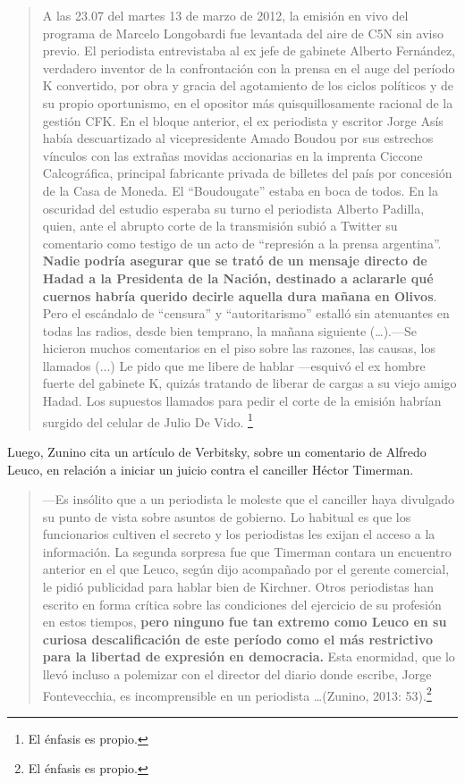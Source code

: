 \begin{quote}
A las 23.07 del martes 13 de marzo de 2012, la emisión en vivo del programa de Marcelo Longobardi fue levantada del aire de C5N sin aviso previo. El periodista entrevistaba al ex jefe de gabinete Alberto Fernández, verdadero inventor de la confrontación con la prensa en el auge del período K convertido, por obra y gracia del agotamiento de los ciclos políticos y de su propio oportunismo, en el opositor más quisquillosamente racional de la gestión CFK. En el bloque anterior, el ex periodista y escritor Jorge Asís había descuartizado al vicepresidente Amado Boudou por sus estrechos vínculos con las extrañas movidas accionarias en la imprenta Ciccone Calcográfica, principal fabricante privada de billetes del país por concesión de la Casa de Moneda. El ``Boudougate'' estaba en boca de todos. En la oscuridad del estudio esperaba su turno el periodista Alberto Padilla, quien, ante el abrupto corte de la transmisión subió a Twitter su comentario como testigo de un acto de ``represión a la prensa argentina''. \textbf{Nadie podría asegurar que se trató de un mensaje directo de Hadad a la Presidenta de la Nación, destinado a aclararle qué cuernos habría querido decirle aquella dura mañana en Olivos}. Pero el escándalo de ``censura'' y ``autoritarismo'' estalló sin atenuantes en todas las radios, desde bien temprano, la mañana siguiente (\ldots).---Se hicieron muchos comentarios en el piso sobre las razones, las causas, los llamados (...) Le pido que me libere de hablar ---esquivó el ex hombre fuerte del gabinete K, quizás tratando de liberar de cargas a su viejo amigo Hadad. Los supuestos llamados para pedir el corte de la emisión habrían surgido del celular de Julio De Vido. \footnote{El énfasis es propio.}
\end{quote}

Luego, Zunino cita un artículo de Verbitsky, sobre un comentario de Alfredo Leuco, en relación a iniciar un juicio contra el canciller Héctor Timerman.

\begin{quote}
---Es insólito que a un periodista le moleste que el canciller haya divulgado su punto de vista sobre asuntos de gobierno. Lo habitual es que los funcionarios cultiven el secreto y los periodistas les exijan el acceso a la información. La segunda sorpresa fue que Timerman contara un encuentro anterior en el que Leuco, según dijo acompañado por el gerente comercial, le pidió publicidad para hablar bien de Kirchner. Otros periodistas han escrito en forma crítica sobre las condiciones del ejercicio de su profesión en estos tiempos, \textbf{pero ninguno fue tan extremo como Leuco en su curiosa descalificación de este período como el más restrictivo para la libertad de expresión en democracia.} Esta enormidad, que lo llevó incluso a polemizar con el director del diario donde escribe, Jorge Fontevecchia, es incomprensible en un periodista \ldots (Zunino, 2013: 53).\footnote{El énfasis es propio.}
\end{quote}

